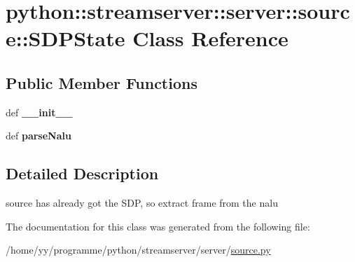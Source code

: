 \hypertarget{classpython_1_1streamserver_1_1server_1_1source_1_1SDPState}{
\section{python::streamserver::server::source::SDPState Class Reference}
\label{classpython_1_1streamserver_1_1server_1_1source_1_1SDPState}
}
\subsection*{Public Member Functions}
\begin{DoxyCompactItemize}
\item 
\hypertarget{classpython_1_1streamserver_1_1server_1_1source_1_1SDPState_aa36f19b399b12fb25e297cf885400aad}{
def {\bfseries \_\-\_\-init\_\-\_\-}}
\label{classpython_1_1streamserver_1_1server_1_1source_1_1SDPState_aa36f19b399b12fb25e297cf885400aad}

\item 
\hypertarget{classpython_1_1streamserver_1_1server_1_1source_1_1SDPState_aac848f03d5598ee6ab24598170565baf}{
def {\bfseries parseNalu}}
\label{classpython_1_1streamserver_1_1server_1_1source_1_1SDPState_aac848f03d5598ee6ab24598170565baf}

\end{DoxyCompactItemize}


\subsection{Detailed Description}
\begin{DoxyVerb}source has already got the SDP, so extract frame from the nalu \end{DoxyVerb}
 

The documentation for this class was generated from the following file:\begin{DoxyCompactItemize}
\item 
/home/yy/programme/python/streamserver/server/\hyperlink{source_8py}{source.py}\end{DoxyCompactItemize}
